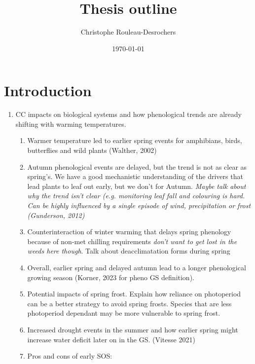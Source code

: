 \documentclass{article}
\title{Thesis outline}
\date{\today}
\author{Christophe Rouleau-Desrochers}
\begin{document}

\maketitle
\section*{Introduction}


\begin{enumerate}

\item CC impacts on biological systems and how phenological trends are already shifting with warming temperatures. 
\begin{enumerate}
\item Warmer temperature led to earlier spring events for amphibians, birds, butterflies and wild plants (Walther, 2002)
\item Autumn phenological events are delayed, but the trend is not as clear as spring's. We have a good mechanistic understanding of the drivers that lead plants to leaf out early, but we don't for Autumn. \textit{Maybe talk about why the trend isn't clear (e.g. monitoring leaf fall and colouring is hard. Can be highly influenced by a single episode of wind, precipitation or frost (Gunderson, 2012)}  
\item Counterinteraction of winter warming that delays spring phenology because of non-met chilling requirements \textit{don't want to get lost in the weeds here though}. Talk about deacclimatation forms during spring
\item Overall, earlier spring and delayed autumn lead to a longer phenological growing season (Korner, 2023 for pheno GS definition).
\item Potential impacts of spring frost. Explain how reliance on photoperiod can be a better strategy to avoid spring frosts. Species that are less photoperiod dependant may be more vulnerable to spring frost.
\item Increased drought events in the summer and how earlier spring might increase water deficit later on in the GS. (Vitesse 2021)
\item Pros and cons of early SOS: \\ 

\end{enumerate}
\end{enumerate}
\end{document}
